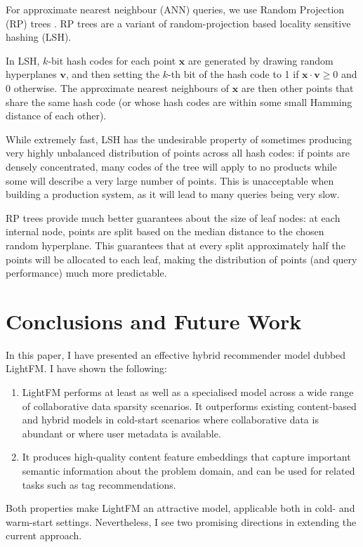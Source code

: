 \documentclass{sig-alternate}
\begin{document}
For approximate nearest neighbour (ANN) queries, we use Random Projection (RP) trees \cite{dasgupta2008random, dasgupta2013randomized}. RP trees are a variant of random-projection \cite{dasgupta2000experiments} based locality sensitive hashing (LSH).

In LSH, $k$-bit hash codes for each point $\boldsymbol{x}$ are generated by drawing random hyperplanes $\boldsymbol{v}$, and then setting the $k$-th bit of the hash code to 1 if $\boldsymbol{x} \cdot \boldsymbol{v} \geq 0$ and 0 otherwise. The approximate nearest neighbours of $\boldsymbol{x}$ are then other points that share the same hash code (or whose hash codes are within some small Hamming distance of each other).

While extremely fast, LSH has the undesirable property of sometimes producing very highly unbalanced distribution of points across all hash codes: if points are densely concentrated, many codes of the tree will apply to no products while some will describe a very large number of points. This is unacceptable when building a production system, as it will lead to many queries being very slow.

RP trees provide much better guarantees about the size of leaf nodes: at each internal node, points are split based on the median distance to the chosen random hyperplane. This guarantees that at every split approximately half the points will be allocated to each leaf, making the distribution of points (and query performance) much more predictable.

\section{Conclusions and Future Work}
\label{sec:conclusions}
In this paper, I have presented an effective hybrid recommender model dubbed LightFM. I have shown the following:
\begin{enumerate}
\item LightFM performs at least as well as a specialised model across a wide range of collaborative data sparsity scenarios. It outperforms existing content-based and hybrid models in cold-start scenarios where collaborative data is abundant or where user metadata is available.
\item It produces high-quality content feature embeddings that capture important semantic information about the problem domain, and can be used for related tasks such as tag recommendations.
\end{enumerate}
Both properties make LightFM an attractive model, applicable both in cold- and warm-start settings. Nevertheless, I see two promising directions in extending the current approach.
\end{document}
